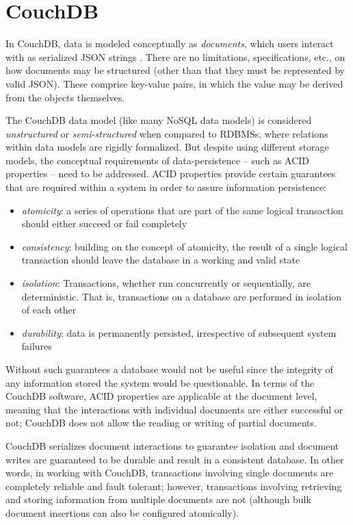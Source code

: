 \section{CouchDB}
In CouchDB, data is modeled conceptually as \textit{documents}, which users interact with as serialized JSON strings \cite{rfc7159}. There are no limitations, specifications, etc., on how documents may be structured (other than that they must be represented by valid JSON). These comprise key-value pairs, in which the value may be derived from the objects themselves.

The CouchDB data model (like many NoSQL data models) is considered \textit{unstructured} or \textit{semi-structured} when compared to RDBMSs, where relations within data models are rigidly formalized. But despite using different storage models, the conceptual requirements of data-persistence – such as ACID properties – need to be addressed. ACID properties provide certain guarantees that are required within a system in order to assure information persistence:

\begin{itemize}
    \item \textit{atomicity}: a series of operations that are part of the same logical transaction should either succeed or fail completely
    \item \textit{consistency}: building on the concept of atomicity, the result of a single logical transaction should leave the database in a working and valid state
    \item \textit{isolation}: Transactions, whether run concurrently or sequentially, are deterministic. That is, transactions on a database are performed in isolation of each other
    \item \textit{durability}: data is permanently persisted, irrespective of subsequent system failures
\end{itemize}

Without such guarantees a database would not be useful since the integrity of any information stored the system would be questionable. In terms of the CouchDB software, ACID properties are applicable at the document level, meaning that the interactions with individual documents are either successful or not; CouchDB does not allow the reading or writing of partial documents.

CouchDB serializes document interactions to guarantee isolation and document writes are guaranteed to be durable and result in a consistent database. In other words, in working with CouchDB, transactions involving single documents are completely reliable and fault tolerant; however, transactions involving retrieving and storing information from multiple documents are not (although bulk document insertions can also be configured atomically).

